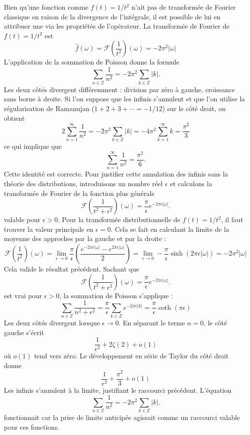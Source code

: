 \documentclass[12pt,a4paper]{article}
\begin{document}
Bien qu'une fonction comme $f(t) = 1/t^2$ n'ait pas de transformée de Fourier classique en raison de la divergence de l'intégrale, il est possible de lui en attribuer une via les propriétés de l'opérateur. La transformée de Fourier de $f(t) = 1/t^2$ est
\[ \hat{f}(\omega) = \mathcal{F}\left(\frac{1}{t^2}\right)(\omega) = -2\pi^2|\omega| \]
L'application de la sommation de Poisson donne la formule
\[ \sum_{n\in\mathbb{Z}} \frac{1}{n^2} = -2\pi^2\sum_{k\in\mathbb{Z}} |k|. \]
Les deux côtés divergent différemment : division par zéro à gauche, croissance sans borne à droite. Si l'on suppose que les infinis s'annulent et que l'on utilise la régularisation de Ramanujan ($1+2+3+\cdots = -1/12$) sur le côté droit, on obtient
\[ 2\sum_{n=1}^{\infty} \frac{1}{n^2} = -2\pi^2\sum_{k\in\mathbb{Z}} |k| = -4\pi^2\sum_{k=1}^{\infty} k = \frac{\pi^2}{3} \]
ce qui implique que
\[ \sum_{n=1}^{\infty} \frac{1}{n^2} = \frac{\pi^2}{6}. \]
Cette identité est correcte. Pour justifier cette annulation des infinis sans la théorie des distributions, introduisons un nombre réel $\epsilon$ et calculons la transformée de Fourier de la fonction plus générale
\[ \mathcal{F}\left(\frac{1}{t^2+\epsilon^2}\right)(\omega) = \frac{\pi}{\epsilon}e^{-2\pi\epsilon|\omega|}. \]
valable pour $\epsilon > 0$. Pour la transformée distributionnelle de $f(t) = 1/t^2$, il faut trouver la valeur principale en $\epsilon = 0$. Cela se fait en calculant la limite de la moyenne des approches par la gauche et par la droite :
\[ \mathcal{F}\left(\frac{1}{t^2}\right)(\omega) = \lim_{\epsilon\to 0} \frac{\pi}{\epsilon}\left(\frac{e^{-2\pi\epsilon|\omega|} - e^{2\pi\epsilon|\omega|}}{2}\right) = \lim_{\epsilon\to 0} -\frac{\pi}{\epsilon}\sinh(2\pi\epsilon|\omega|) = -2\pi^2|\omega| \]
Cela valide le résultat précédent. Sachant que
\[ \mathcal{F}\left(\frac{1}{t^2+\epsilon^2}\right)(\omega) = \frac{\pi}{\epsilon}e^{-2\pi\epsilon|\omega|}. \]
est vrai pour $\epsilon > 0$, la sommation de Poisson s'applique :
\[ \sum_{n\in\mathbb{Z}} \frac{1}{n^2+\epsilon^2} = \frac{\pi}{\epsilon}\sum_{k\in\mathbb{Z}} e^{-2\pi\epsilon|k|} = \frac{\pi}{\epsilon}\coth(\pi\epsilon) \]
Les deux côtés divergent lorsque $\epsilon\to 0$. En séparant le terme $n=0$, le côté gauche s'écrit
\[ \frac{1}{\epsilon^2} + 2\zeta(2) + o(1) \]
où $o(1)$ tend vers zéro. Le développement en série de Taylor du côté droit donne
\[ \frac{1}{\epsilon^2} + \frac{\pi^2}{3} + o(1) \]
Les infinis s'annulent à la limite, justifiant le raccourci précédent. L'équation
\[ \sum_{n\in\mathbb{Z}} \frac{1}{n^2} = -2\pi^2\sum_{k\in\mathbb{Z}} |k|. \]
fonctionnait car la prise de limite anticipée agissait comme un raccourci valable pour ces fonctions.
\end{document}
